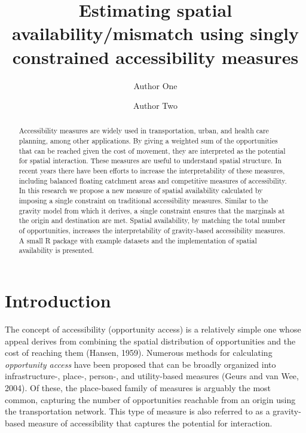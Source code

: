 \documentclass[]{elsarticle} %
\begin{document}
\begin{frontmatter}

  \title{Estimating spatial availability/mismatch using singly
constrained accessibility measures}
    \author[Some School]{Author One}
    \author[Some School]{Author Two}
      \address[Some School]{Address}
  
  \begin{abstract}
  Accessibility measures are widely used in transportation, urban, and
  health care planning, among other applications. By giving a weighted
  sum of the opportunities that can be reached given the cost of
  movement, they are interpreted as the potential for spatial
  interaction. These measures are useful to understand spatial
  structure. In recent years there have been efforts to increase the
  interpretability of these measures, including balanced floating
  catchment areas and competitive measures of accessibility. In this
  research we propose a new measure of spatial availability calculated
  by imposing a single constraint on traditional accessibility measures.
  Similar to the gravity model from which it derives, a single
  constraint ensures that the marginals at the origin and destination
  are met. Spatial availability, by matching the total number of
  opportunities, increases the interpretability of gravity-based
  accessibility measures. A small R package with example datasets and
  the implementation of spatial availability is presented.
  \end{abstract}
  
 \end{frontmatter}

\newpage

\hypertarget{introduction}{%
\section{Introduction}\label{introduction}}

The concept of accessibility (opportunity access) is a relatively simple
one whose appeal derives from combining the spatial distribution of
opportunities and the cost of reaching them (Hansen, 1959). Numerous
methods for calculating \emph{opportunity access} have been proposed
that can be broadly organized into infrastructure-, place-, person-, and
utility-based measures (Geurs and van Wee, 2004). Of these, the
place-based family of measures is arguably the most common, capturing
the number of opportunities reachable from an origin using the
transportation network. This type of measure is also referred to as a
gravity-based measure of accessibility that captures the potential for
interaction.
\end{document}
